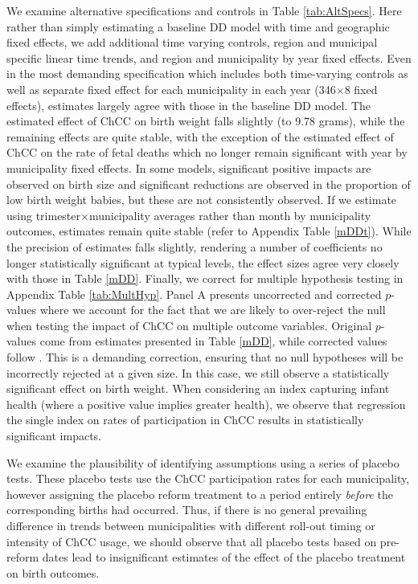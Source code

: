 \documentclass[12pt]{article}
\begin{document}
\begin{spacing}{1.4}
We examine alternative specifications and controls in Table
\ref{tab:AltSpecs}.  Here rather than simply estimating a baseline
DD model with time and geographic fixed effects, we add additional
time varying controls, region and municipal specific linear time
trends, and region and municipality by year fixed effects.  Even in
the most demanding specification which includes both time-varying
controls as well as separate fixed effect for each municipality in
each year (346$\times$8 fixed effects), estimates largely agree
with those in the baseline DD model.  The estimated effect of ChCC
on birth weight falls slightly (to 9.78 grams), while the remaining
effects are quite stable, with the exception of the estimated effect
of ChCC on the rate of fetal deaths which no longer remain significant
with year by municipality fixed effects.  In some models,
significant positive impacts are observed on birth size and
significant reductions are observed in the proportion of low birth
weight babies, but these are not consistently observed. 
If we estimate using trimester$\times$municipality averages rather
than month by municipality outcomes, estimates remain quite stable
(refer to Appendix Table \ref{mDDt}).  While the precision of
estimates falls slightly, rendering a number of coefficients no longer
statistically significant at typical levels, the effect sizes agree
very closely with those in Table \ref{mDD}. %
Finally, we correct for multiple hypothesis testing in Appendix
Table \ref{tab:MultHyp}.  Panel A presents uncorrected and
corrected $p$-values where we account for the fact that we are
likely to over-reject the null when testing the impact of ChCC
on multiple outcome variables.  Original $p$-values come from
estimates presented in Table \ref{mDD}, while corrected values
follow \citet{RomanoWolf2005}.  This is a demanding correction,
ensuring that no null hypotheses will be incorrectly rejected
at a given size.  In this case, we still observe a statistically
significant effect on birth weight.  When considering an index
capturing infant health (where a positive value implies greater
health), we observe that regression the single index on rates
of participation in ChCC results in statistically significant
impacts.

We examine the plausibility of identifying assumptions using a
series of placebo tests.  These placebo tests use the ChCC
participation rates for each municipality, however assigning the
placebo reform treatment to a period entirely \emph{before} the
corresponding births had occurred.  Thus, if there is no general
prevailing difference in trends between municipalities with different
roll-out timing or intensity of ChCC usage, we should observe
that all placebo tests based on pre-reform dates lead to
insignificant estimates of the effect of the placebo treatment on
birth outcomes.


\end{spacing}
\end{document}
